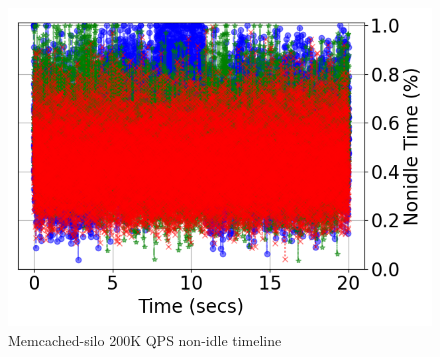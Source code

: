 \begin{figure}
  \includegraphics[width=\columnwidth]{osdi_figures/mcdsilo_200000_nonidle_timeline.png}
  \caption{Memcached-silo 200K QPS non-idle timeline}
  \label{fig:mcdsilo200000_nonidle_timeline}
\end{figure}
